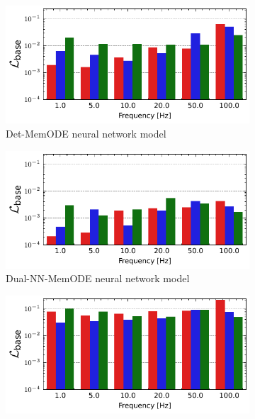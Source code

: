 \documentclass[11pt, oneside]{article}
\begin{document}
\begin{figure}[htbp!]
    \centering
    \begin{subfigure}[c]{0.48\linewidth}
        \centering
        \includegraphics[width=\linewidth]{mms_results/loss_per_freq_Det-MemODE.pdf}
        \caption{Det-MemODE neural network model}
    \end{subfigure}
    \begin{subfigure}[c]{0.48\linewidth}
        \centering
        \includegraphics[width=\linewidth]{mms_results/loss_per_freq_Dual-NN-MemODE.pdf}
        \caption{Dual-NN-MemODE neural network model}
    \end{subfigure}
    \begin{subfigure}[c]{0.48\linewidth}
        \centering
        \includegraphics[width=\linewidth]{mms_results/loss_per_freq_MMS Model.pdf}

\end{subfigure}
\end{figure}
\end{document}
